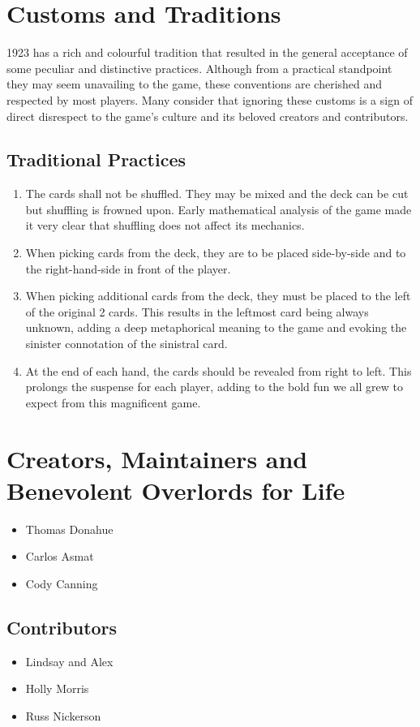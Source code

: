 \documentclass[11pt]{article}
\begin{document}
\section{Customs and Traditions}
\label{sec-3}

1923 has a rich and colourful tradition that resulted in the general acceptance
of some peculiar and distinctive practices. Although from a practical standpoint
they may seem unavailing to the game, these conventions are cherished and
respected by most players. Many consider that ignoring these customs is a sign
of direct disrespect to the game's culture and its beloved creators and
contributors.

\subsection{Traditional Practices}
\label{sec-3-1}
\begin{enumerate}
\item The cards shall not be shuffled. They may be mixed and the deck can be cut
but shuffling is frowned upon. Early mathematical analysis of the game made
it very clear that shuffling does not affect its mechanics.

\item When picking cards from the deck, they are to be placed side-by-side and to
the right-hand-side in front of the player.

\item When picking additional cards from the deck, they must be placed to the left
of the original 2 cards. This results in the leftmost card being always
unknown, adding a deep metaphorical meaning to the game and evoking the
sinister connotation of the sinistral card.

\item At the end of each hand, the cards should be revealed from right to left.
This prolongs the suspense for each player, adding to the bold fun we all
grew to expect from this magnificent game.
\end{enumerate}


\section{Creators, Maintainers and Benevolent Overlords for Life}
\label{sec-4}
\begin{itemize}
\item Thomas Donahue
\item Carlos Asmat
\item Cody Canning
\end{itemize}

\subsection{Contributors}
\label{sec-4-1}
\begin{itemize}
\item Lindsay and Alex
\item Holly Morris
\item Russ Nickerson
\end{itemize}
\end{document}
